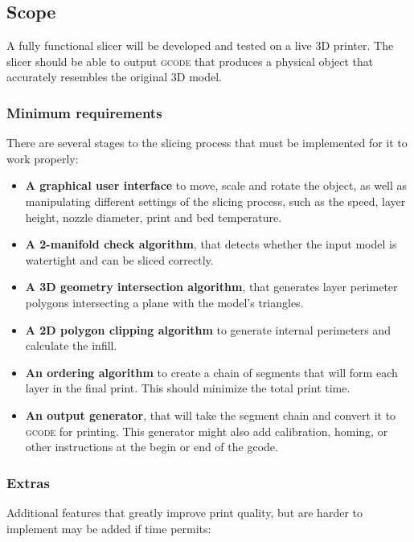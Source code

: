 \subsection{Scope}
A fully functional slicer will be developed and tested on a live 3D printer. The slicer should be able to output \textsc{gcode} that produces a physical object that accurately resembles the original 3D model.

\subsubsection{Minimum requirements}
There are several stages to the slicing process that must be implemented for it to work properly:

\begin{itemize}
    \item \textbf{A graphical user interface} to move, scale and rotate the object, as well as manipulating different settings of the slicing process, such as the speed, layer height, nozzle diameter, print and bed temperature.
    \item \textbf{A 2-manifold \cite{wiki:2-manifold} check algorithm}, that detects whether the input model is watertight and can be sliced correctly.
    \item \textbf{A 3D geometry intersection algorithm}, that generates layer perimeter polygons intersecting a plane with the model's triangles.
    \item \textbf{A 2D polygon clipping algorithm} to generate internal perimeters and calculate the infill.
    \item \textbf{An ordering algorithm} to create a chain of segments that will form each layer in the final print. This should minimize the total print time.
    \item \textbf{An output  generator}, that will take the segment chain and convert it to \textsc{gcode} for printing. This generator might also add calibration, homing, or other instructions at the begin or end of the gcode.
\end{itemize}

\subsubsection{Extras}

Additional features that greatly improve print quality, but are harder to implement may be added if time permits:

